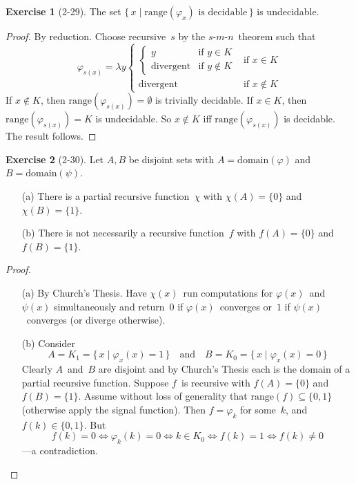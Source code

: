 \documentclass[letterpaper]{article}
\newcommand{\dom}{\mathrm{domain}}
\newcommand{\ran}{\mathrm{range}}
\newcommand{\smn}{$s$-$m$-$n$}
\theoremstyle{definition}
\newtheorem*{exer}{Exercise}
\theoremstyle{remark}
\theoremstyle{direction}
\begin{document}
\begin{exer}[2-29]
The set $\{\,x\mid\ran(\varphi_x)\text{ is decidable}\,\}$ is undecidable.
\end{exer}
\begin{proof}
By reduction. Choose recursive~$s$ by the \smn\ theorem such that
$$\varphi_{s(x)}=\lambda y\begin{cases}
\begin{cases}
y&\text{if }y\in K\\
\text{divergent}&\text{if }y\not\in K
\end{cases}&\text{if }x\in K\\
\text{divergent}&\text{if }x\not\in K
\end{cases}$$
If $x\not\in K$, then $\ran(\varphi_{s(x)})=\emptyset$ is trivially decidable. If $x\in K$, then $\ran(\varphi_{s(x)})=K$ is undecidable. So $x\not\in K$ iff $\ran(\varphi_{s(x)})$ is decidable. The result follows.
\end{proof}

\begin{exer}[2-30]
Let $A,B$ be disjoint sets with $A=\dom(\varphi)$ and $B=\dom(\psi)$.
\begin{enumerate}[itemsep=0pt]
\item[(a)] There is a partial recursive function~$\chi$ with $\chi(A)=\{0\}$ and $\chi(B)=\{1\}$.
\item[(b)] There is not necessarily a recursive function~$f$ with $f(A)=\{0\}$ and $f(B)=\{1\}$.
\end{enumerate}
\end{exer}
\begin{proof}
\begin{enumerate}[itemsep=0pt]
\item[(a)] By Church's Thesis. Have $\chi(x)$~run computations for $\varphi(x)$~and~$\psi(x)$ simultaneously and return~$0$ if $\varphi(x)$~converges or~$1$ if $\psi(x)$~converges (or diverge otherwise).
\item[(b)] Consider
$$A=K_1=\{\,x\mid\varphi_x(x)=1\,\}\quad\text{and}\quad B=K_0=\{\,x\mid\varphi_x(x)=0\,\}$$
Clearly $A$~and~$B$ are disjoint and by Church's Thesis each is the domain of a partial recursive function. Suppose $f$~is recursive with $f(A)=\{0\}$ and $f(B)=\{1\}$. Assume without loss of generality that $\ran(f)\subseteq\{0,1\}$ (otherwise apply the signal function). Then $f=\varphi_k$ for some~$k$, and $f(k)\in\{0,1\}$. But
$$f(k)=0\iff\varphi_k(k)=0\iff k\in K_0\iff f(k)=1\iff f(k)\ne0$$
---a contradiction.\qedhere
\end{enumerate}
\end{proof}
\end{document}
